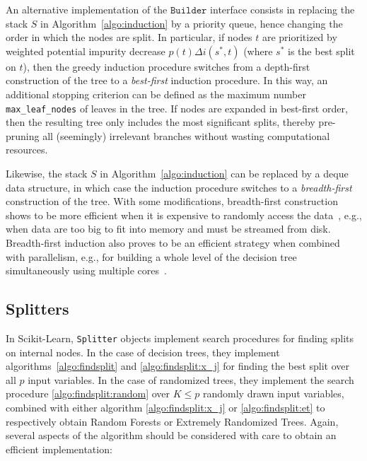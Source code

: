 An alternative implementation of the $\texttt{Builder}$ interface consists in
replacing the stack $S$ in Algorithm~\ref{algo:induction} by a priority queue,
hence changing the order in which the nodes are split. In particular, if nodes
$t$ are prioritized by weighted potential impurity decrease $p(t) \Delta
i(s^*,t)$ (where $s^*$ is the best split on $t$), then the greedy induction
procedure switches from a depth-first construction of the tree to a \textit
{best-first} induction procedure. In this way, an additional stopping criterion
can be defined as the maximum number \texttt{max\_leaf\_nodes} of leaves in the
tree. If nodes are expanded in best-first order, then the resulting tree only
includes the most significant splits, thereby pre-pruning all (seemingly)
irrelevant branches without wasting computational resources.

Likewise,  the stack $S$ in Algorithm~\ref{algo:induction} can be replaced by a
deque data structure, in which case the induction procedure switches to a
\textit{breadth-first} construction of the tree. With some modifications,
breadth-first construction shows to be more efficient when it is expensive to
randomly access the data~\citep{criminisi:2013}, e.g., when data are too big to
fit into memory and must be streamed from disk. Breadth-first induction also
proves to be an efficient strategy when combined with parallelism, e.g., for
building a whole level of the decision tree simultaneously using multiple
cores~\citep{liao:2013}.

\subsection{Splitters}
\label{sec:5:impl:splitters}

In Scikit-Learn, \texttt{Splitter} objects implement search procedures for
finding splits on internal nodes. In the case of decision trees, they implement
algorithms~\ref{algo:findsplit} and \ref{algo:findsplit:x_j} for finding the
best split over all $p$ input variables. In the case of randomized trees, they
implement the search procedure \ref{algo:findsplit:random} over $K \leq p$
randomly drawn input variables, combined with either algorithm
\ref{algo:findsplit:x_j} or  \ref{algo:findsplit:et} to respectively obtain
Random Forests or Extremely Randomized Trees. Again, several aspects of the
algorithm should be considered with care to obtain an efficient implementation:


